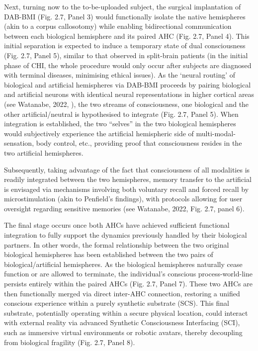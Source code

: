 \documentclass[10pt]{article}
\begin{document}
\begin{sloppypar}
  Next, turning now to the to-be-uploaded subject, the surgical implantation of DAB-BMI (Fig. 2.7, Panel 3) would functionally isolate the native hemispheres (akin to a corpus callosotomy) while enabling bidirectional communication between each biological hemisphere and its paired AHC (Fig. 2.7, Panel 4). This initial separation is expected to induce a temporary state of dual consciousness (Fig. 2.7, Panel 5), similar to that observed in split-brain patients (in the initial phase of CHI, the whole procedure would only occur after subjects are diagnosed with terminal diseases, minimising ethical issues). As the ‘neural routing’ of biological and artificial hemispheres via DAB-BMI proceeds by pairing biological and artificial neurons with identical neural representations in higher cortical areas (see Watanabe, 2022, \cite{watanabe2011attention}), the two streams of consciousness, one biological and the other artificial/neutral is hypothesised to integrate (Fig. 2.7, Panel 5). When integration is established, the two “selves” in the two biological hemispheres would subjectively experience the artificial hemispheric side of multi-modal-sensation, body control, etc., providing proof that consciousness resides in the two artificial hemispheres.

  Subsequently, taking advantage of the fact that consciousness of all modalities is readily integrated between the two hemispheres, memory transfer to the artificial is envisaged via mechanisms involving both voluntary recall and forced recall by microstimulation (akin to Penfield’s findings), with protocols allowing for user oversight regarding sensitive memories (see Watanabe, 2022, Fig. 2.7, panel 6).

  The final stage occurs once both AHCs have achieved sufficient functional integration to fully support the dynamics previously handled by their biological partners. In other words, the formal relationship between the two original biological hemispheres has been established between the two pairs of biological/artificial hemispheres. As the biological hemispheres naturally cease function or are allowed to terminate, the individual’s conscious process-world-line persists entirely within the paired AHCs (Fig. 2.7, Panel 7). These two AHCs are then functionally merged via direct inter-AHC connection, restoring a unified conscious experience within a purely synthetic substrate (SCS). This final substrate, potentially operating within a secure physical location, could interact with external reality via advanced Synthetic Consciousness Interfacing (SCI), such as immersive virtual environments or robotic avatars, thereby decoupling from biological fragility (Fig. 2.7, Panel 8).


\end{sloppypar}
\end{document}
